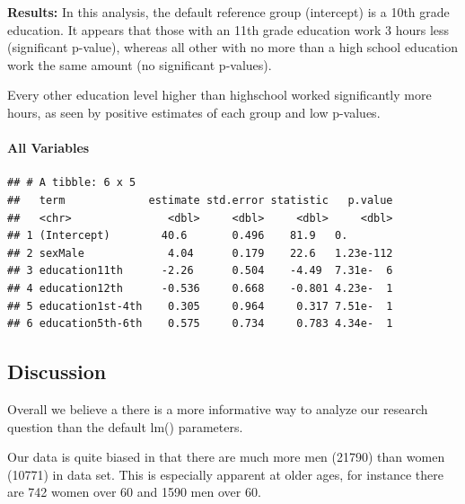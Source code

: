 \documentclass[]{article}
\let\oldparagraph\paragraph
\renewcommand{\paragraph}[1]{\oldparagraph{#1}\mbox{}}
\begin{document}
\textbf{Results:} In this analysis, the default reference group
(intercept) is a 10th grade education. It appears that those with an
11th grade education work 3 hours less (significant p-value), whereas
all other with no more than a high school education work the same amount
(no significant p-values).

Every other education level higher than highschool worked significantly
more hours, as seen by positive estimates of each group and low
p-values.

\hypertarget{all-variables}{%
\paragraph{All Variables}\label{all-variables}}

\begin{verbatim}
## # A tibble: 6 x 5
##   term             estimate std.error statistic   p.value
##   <chr>               <dbl>     <dbl>     <dbl>     <dbl>
## 1 (Intercept)        40.6       0.496    81.9   0.       
## 2 sexMale             4.04      0.179    22.6   1.23e-112
## 3 education11th      -2.26      0.504    -4.49  7.31e-  6
## 4 education12th      -0.536     0.668    -0.801 4.23e-  1
## 5 education1st-4th    0.305     0.964     0.317 7.51e-  1
## 6 education5th-6th    0.575     0.734     0.783 4.34e-  1
\end{verbatim}

\hypertarget{discussion}{%
\subsection{Discussion}\label{discussion}}

Overall we believe a there is a more informative way to analyze our
research question than the default lm() parameters.

Our data is quite biased in that there are much more men (21790) than
women (10771) in data set. This is especially apparent at older ages,
for instance there are 742 women over 60 and 1590 men over 60.
\end{document}
